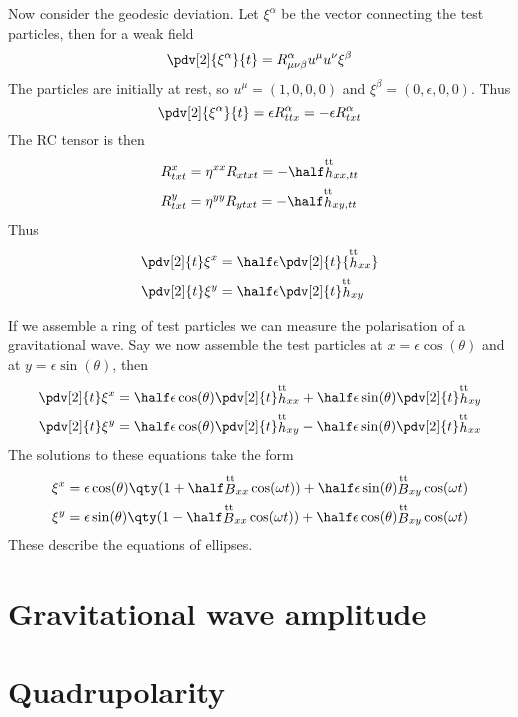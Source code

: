 Now consider the geodesic deviation. Let $\xi^{\alpha}$ be the vector
connecting the test particles, then for a weak field
\begin{equation}
  \label{eq:28}
  \pdv[2]{\xi^{\alpha}}{t} = R^{\alpha}_{\mu \nu \beta} u^{\mu} u^{\nu} \xi^{\beta}
\end{equation}
The particles are initially at rest, so $u^{\mu} = (1,0,0,0)$ and
$\xi^{\beta} = (0, \epsilon, 0, 0)$. Thus
\begin{equation}
  \label{eq:29}
  \pdv[2]{\xi^{\alpha}}{t} = \epsilon R^{\alpha}_{ttx} = - \epsilon R^{\alpha}_{txt}
\end{equation}
The RC tensor is then
\begin{subequations}
  \begin{align}
    R^x_{txt} &= \eta^{xx} R_{xtxt} = - \half \trt{h}_{xx,tt} \\
R^y_{txt} &= \eta^{yy} R_{ytxt} = - \half \trt{h}_{xy,tt}
  \end{align}
\end{subequations}
Thus
\begin{subequations}
\begin{align}
  \label{eq:30}
  \pdv[2]{t} \xi^x &= \half \epsilon \pdv[2]{t} {\trt{h}_{xx}} \\
\pdv[2]{t} \xi^y &= \half \epsilon \pdv[2]{t} \trt{h}_{xy}
\end{align}
\end{subequations}

If we assemble a ring of test particles we can measure the
polarisation of a gravitational wave. Say we now assemble the test
particles at $x = \epsilon \cos(\theta)$ and at $y = \epsilon
\sin(\theta)$, then
\begin{subequations}
  \begin{align}
    \pdv[2]{t} \xi^x &= \half \epsilon \cos(\theta) \pdv[2]{t} \trt{h}_{xx} + \half \epsilon \sin(\theta) \pdv[2]{t} \trt{h}_{xy} \\
\pdv[2]{t} \xi^y &=  \half \epsilon \cos(\theta) \pdv[2]{t} \trt{h}_{xy} - \half \epsilon \sin(\theta) \pdv[2]{t} \trt{h}_{xx}
  \end{align}
\end{subequations}
The solutions to these equations take the form
\begin{subequations}
  \begin{align}
    \xi^x &= \epsilon \cos(\theta) \qty( 1 + \half \trt{B}_{xx} \cos(\omega t)) + \half \epsilon \sin(\theta) \trt{B}_{xy} \cos(\omega t) \\
\xi^y &= \epsilon \sin(\theta) \qty( 1 - \half \trt{B}_{xx} \cos(\omega t) ) + \half \epsilon \cos(\theta) \trt{B}_{xy} \cos(\omega t)
  \end{align}
\end{subequations}
These describe the equations of ellipses.
\section{Gravitational wave amplitude}
\label{sec:grav-wave-ampl}

\section{Quadrupolarity}
\label{sec:quadrupolarity}



